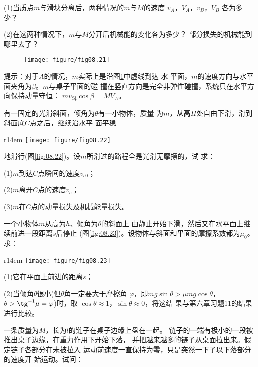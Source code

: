 \documentclass[../outline-of-mechanics.tex]{subfiles}
\begin{document}
\begin{exercises}
(1)当质点$ m $与滑块分离后，两种情况的$ m $与$ M $的速度
$ v _ { A } $，$ V _ { A } $，$ v _ { B } $，$ V _ { B } $
各为多少？

(2)在这两种情况下，$ m $与$ M $分开后机械能的变化各为多少？
部分损失的机械能到哪里去了？
\begin{figure}[h]
  \centering
  \texttt{[image: figure/fig08.21]}
  \caption{}
  \label{fig:08.21}
\end{figure}

\lhbrak 提示：对于$ A $的情况，$ m $实际上是沿图\ref{fig:08.21}中虚线到达
水
\clearpage\noindent
平面，$ m $的速度方向与水平面夹角为$ \beta $。$ m $与桌子平面的碰
撞在竖直方向是完全非弹性碰撞，系统只在水平方向保持动量守恒：
$ m v _ \text {斜} \cos \beta = M V _ { A }$。\rhbrak

\exercise 有一固定的光滑斜面，倾角为$ \theta $有一小物体，质量
为$ m $，从高$ H $处自由下滑，滑到斜面底$ C $点之后，继续沿水平
面平稳
\begin{wrapfigure}[7]{r}{14em}
  \vspace{1.5em}
  \centering
  \texttt{[image: figure/fig08.22]}
  \caption{}
  \label{fig:08.22}
\end{wrapfigure}
地滑行(图\ref{fig:08.22})。设$ m $所滑过的路程全是光滑无摩擦的，试
求：

(1)\;$ m $到达$ C $点瞬间的速度$ v _ { c 0 } $；

(2)\;$ m $离开$ C $点的速度$ v _ { c } $；

(3)\;$ m $在$ C $点的动量损失及机械能量损失。

\exercise 一个小物体$ m $从高为$ h $、倾角为$ \theta $的斜面上
由静止开始下滑，然后又在水平面上继续前进一段距离$ s $后停止
(图\ref{fig:08.23})。设物体与斜面和平面的摩擦系数都为$ \mu _ { 0 } $。求：

\begin{wrapfigure}[7]{r}{14em}
  \vspace{1.5em}
  \centering
  \texttt{[image: figure/fig08.23]}
  \caption{}
  \label{fig:08.23}
\end{wrapfigure}
(1)它在平面上前进的距离$ s $；

(2)当倾角$ \theta $很小(但$ \theta $角一定要大于摩擦角
$ \varphi $，即$ m g \sin \theta > \mu m g \cos \theta $，
$ \theta > \tg ^ { -1 } \mu = \varphi $)时，取
$ \cos \theta \approx 1 $，$\sin \theta \approx 0 $，将这结
果与第六章习题11的结果进行比较。

\exercise 一条质量为$ M $，长为$ l $的链子在桌子边缘上盘在一起。
链子的一端有极小的一段被推出桌子边缘，在重力作用下开始下落，
并把越来越多的链子从桌面拉出来。假定链子各部分在未被拉入
运动前速度一直保持为零，只是突然一下子以下落部分的速度开
始运动。试问：


\end{exercises}
\end{document}
